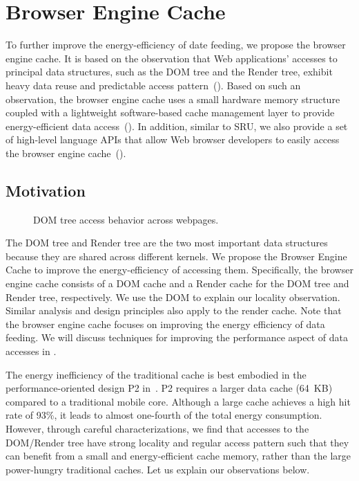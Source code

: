 \section{Browser Engine Cache}
\label{sec:arch:cache}

To further improve the energy-efficiency of date feeding, we propose the browser engine cache. It is based on the observation that Web applications' accesses to principal data structures, such as the DOM tree and the Render tree, exhibit heavy data reuse and predictable access pattern~(). Based on such an observation, the browser engine cache uses a small hardware memory structure coupled with a lightweight software-based cache management layer to provide energy-efficient data access~(). In addition, similar to SRU, we also provide a set of high-level language APIs that allow Web browser developers to easily access the browser engine cache~().

\subsection{Motivation}
\label{sec:cache:motivation}

\begin{figure}[t]
\centering
{}
\hspace*{15pt}
\caption{\small DOM tree access behavior across webpages.}
\label{fig:dom-loc}
\end{figure}

The DOM tree and Render tree are the two most important data structures because they are shared across different kernels. We propose the Browser Engine Cache to improve the energy-efficiency of accessing them. Specifically, the browser engine cache consists of a DOM cache and a Render cache for the DOM tree and Render tree, respectively. We use the DOM to explain our locality observation. Similar analysis and design principles also apply to the render cache. Note that the browser engine cache focuses on improving the energy efficiency of data feeding. We will discuss techniques for improving the performance aspect of data accesses in .

The energy inefficiency of the traditional cache is best embodied in the performance-oriented design P2 in~. P2 requires a larger data cache (64~KB) compared to a traditional mobile core. Although a large cache achieves a high hit rate of 93\%, it leads to almost one-fourth of the total energy consumption. However, through careful characterizations, we find that accesses to the DOM/Render tree have strong locality and regular access pattern such that they can benefit from a small and energy-efficient cache memory, rather than the large power-hungry traditional caches. Let us explain our observations below.

